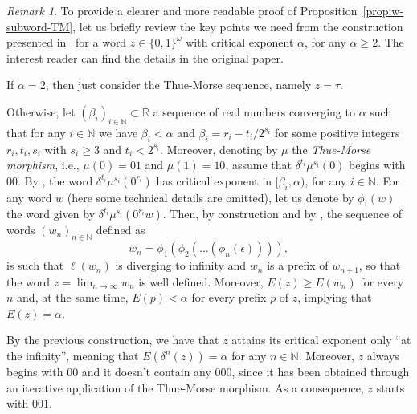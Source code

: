 \documentclass[12pt]{article}
\theoremstyle{plain}\newtheorem{teo}{Theorem}
\theoremstyle{plain}\newtheorem{proposition}[teo]{Proposition}
\theoremstyle{plain}\newtheorem{lemma}[teo]{Lemma}
\theoremstyle{plain}\newtheorem{corollary}[teo]{Corollary}
\theoremstyle{plain}\newtheorem{conjecture}[teo]{Conjecture}
\theoremstyle{definition}\newtheorem{definition}[teo]{Definition}
\theoremstyle{remark}\newtheorem{remark}[teo]{Remark}
\theoremstyle{definition}\newtheorem{example}[teo]{Example}
\numberwithin{teo}{section}
\numberwithin{equation}{section}
\begin{document}
\begin{remark}
	\label{rem:currieConstruction}
	To provide a clearer and more readable proof of
	Proposition~\ref{prop:w-subword-TM}, let us briefly review
	the key points we need from the construction presented
	in~\cite{currie2008each} for a word
	$z \in \{0,1\}^{\omega}$ with critical exponent $\alpha$,
	for any $\alpha \ge 2$.
	The interest reader can find the details in the original paper.

	If $\alpha = 2$, then just consider the Thue-Morse sequence,
	namely $z = \tau$.

	Otherwise, let $(\beta_i)_{i \in \mathbb{N}}\subset \mathbb{R}$
	a sequence of real numbers converging to $\alpha$
	such that for any $i \in \mathbb{N}$
	we have
	$\beta_i < \alpha$ 
	and $\beta_i = r_i - t_i/2^{s_i}$
	for some positive integers $r_i,t_i,s_i$ with $s_i \ge 3$
	and $t_i < 2^{s_i}$.
	Moreover, denoting by $\mu$ the \emph{Thue-Morse morphism},
	i.e., $\mu(0) = 01$ and $\mu(1) = 10$,
	assume that $\delta^{t_i}\mu^{s_i}(0)$
	begins with $00$.
	By \cite[Lemma 5]{currie2008each},
	the word $\delta^{t_i}\mu^{s_i}(0^{r_i})$
	has critical exponent in $[\beta_i,\alpha)$,
	for any $i \in \mathbb{N}$.
	For any word $w$ (here some technical details are omitted),
	let us denote by
	$\phi_i(w)$ the word given by
	$\delta^{t_i}\mu^{s_i}(0^{r_i}w)$.
	Then, by construction and by \cite[Lemma 5]{currie2008each},
	the sequence of words $(w_n)_{n \in \mathbb{N}}$
	defined as 
	\[
		w_n = \phi_1(\phi_2(\dots (\phi_n(\epsilon)))),
	\]
	is such that $\ell(w_n)$ is diverging to infinity
	and $w_n$ is a prefix of $w_{n+1}$,
	so that the word $z = \lim_{n \to \infty}w_n$
	is well defined.
	Moreover, $E(z) \ge E(w_n)$ for every $n$
	and, at the same time, $E(p) < \alpha$ for every 
	prefix $p$ of $z$, implying that 
	$E(z) = \alpha$.

	By the previous construction, 
	we have that $z$ attains its critical exponent
	only ``at the infinity'', meaning that 
	$E(\delta^n(z)) = \alpha$ for any $n \in \mathbb{N}$.
	Moreover, $z$ always begins with $00$
	and it doesn't contain any $000$, since it has been obtained 
	through an iterative application of the Thue-Morse morphism.
	As a consequence, $z$ starts with $001$.
\end{remark}
\end{document}
